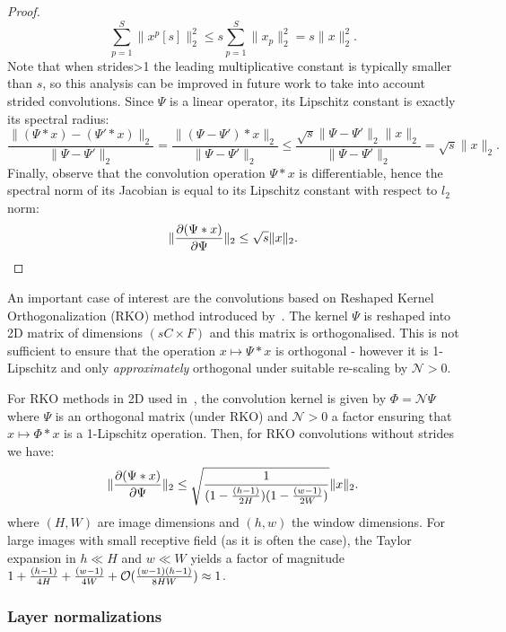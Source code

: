 \begin{proof}
            $$\sum_{p=1}^S \|x^p[s]\|^2_2 \leq s\sum_{p=1}^S \|x_p\|_2^2=s\|x\|_2^2.$$
        Note that when strides>1 the leading multiplicative constant is typically smaller than $s$, so this analysis can be improved in future work to take into account strided convolutions.  
        Since $\Psi$ is a linear operator, its Lipschitz constant is exactly its spectral radius:
        $$\frac{\|(\Psi*x)-(\Psi'*x)\|_2}{\|\Psi-\Psi'\|_2}=\frac{\|(\Psi-\Psi')*x\|_2}{\|\Psi-\Psi'\|_2}\leq \frac{\sqrt{s}\|\Psi-\Psi'\|_2\|x\|_2}{\|\Psi-\Psi'\|_2}= \sqrt{s}\|x\|_2.$$
        Finally, observe that the convolution operation $\Psi*x$ is differentiable, hence the spectral norm of its Jacobian is equal to its Lipschitz constant with respect to $l_2$ norm:
            $$\|\frac{\partial (\Psi*x)}{\partial \Psi}\|_2\leq \sqrt{s}\|x\|_2.$$
    \end{proof}
    
    An important case of interest are the convolutions based on Reshaped Kernel Orthogonalization (RKO) method introduced by~\cite{li2019preventing}. The kernel $\Psi$ is reshaped into 2D matrix of dimensions $(sC\times F)$ and this matrix is orthogonalised. This is not sufficient to ensure that the operation $x\mapsto \Psi*x$ is orthogonal - however it is 1-Lipschitz and only \textit{approximately} orthogonal under suitable re-scaling by $\mathcal{N}>0$.  
    
    \begin{corollary}
        For RKO methods in 2D used in~\cite{serrurier2021achieving}, the convolution kernel is given by $\Phi = \mathcal{N}\Psi$ where $\Psi$ is an orthogonal matrix (under RKO) and $\mathcal{N}>0$ a factor ensuring that $x\mapsto \Phi*x$ is a 1-Lipschitz operation. Then, for RKO convolutions without strides we have:
        \begin{equation}
            \|\frac{\partial (\Psi*x)}{\partial \Psi}\|_2\leq \sqrt{\frac{1}{(1-\frac{(h-1)}{2H})(1-\frac{(w-1)}{2W})}}\|x\|_2.
        \end{equation}
        where $(H,W)$ are image dimensions and $(h,w)$ the window dimensions. For large images with small receptive field (as it is often the case), the Taylor expansion in $h\ll H$ and $w\ll W$ yields a factor of magnitude $1+\frac{(h-1)}{4H}+\frac{(w-1)}{4W}+\mathcal{O}(\frac{(w-1)(h-1)}{8HW})\approx 1$.
    \end{corollary}
    
    \subsubsection{Layer normalizations}\label{ap:layernorm}
    
